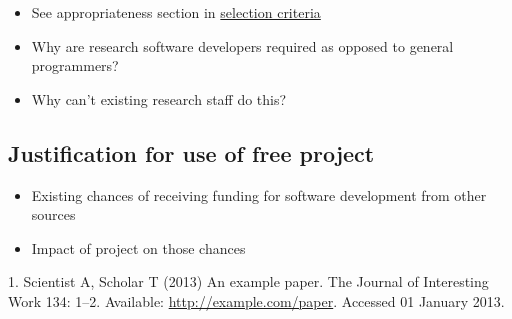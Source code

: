 \documentclass[]{scrartcl}
\begin{document}
\begin{itemize}
\itemsep1pt\parskip0pt
\item
  See appropriateness section in
  \href{http://development.rc.ucl.ac.uk/termly-call/selection.html}{selection
  criteria}
\item
  Why are research software developers required as opposed to general
  programmers?
\item
  Why can't existing research staff do this?
\end{itemize}

\subsection{Justification for use of free
project}\label{justification-for-use-of-free-project}

\begin{itemize}
\itemsep1pt\parskip0pt
\item
  Existing chances of receiving funding for software development from
  other sources
\item
  Impact of project on those chances
\end{itemize}

1. Scientist A, Scholar T (2013) An example paper. The Journal of
Interesting Work 134: 1--2. Available: \url{http://example.com/paper}.
Accessed 01 January 2013.
\end{document}
